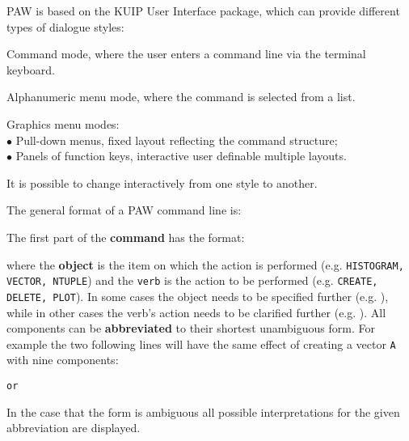 PAW is based on the KUIP\cite{bib-KUIP} User Interface package,
which can provide different types of dialogue styles:

\begin{UL}
\item Command mode,
      where the user enters a command line via the terminal keyboard.
\item Alphanumeric menu mode,
      where the command is selected from a list.
\item Graphics menu modes:\\
\hspace*{1em}$\bullet$ 
Pull-down menus, fixed layout reflecting the command structure;\\
\hspace*{1em}$\bullet$ 
Panels of function keys, interactive user definable multiple layouts.
\end{UL}

It is possible to change interactively from one style to another.
 
The general format of a PAW command line is:
\begin{alltt}
\end{alltt}
The first part of the {\bf command} has the format:
\begin{alltt}
\end{alltt}
where the {\bf object} is the item on which the action is performed
(e.g. \texttt{HISTOGRAM, VECTOR, NTUPLE})
and the \texttt{verb} is the action to be performed (e.g.
\texttt{CREATE, DELETE, PLOT}). 
In some cases the object needs to be
specified further (e.g. ),
while in other cases the verb's action needs to be clarified further
(e.g. ).
All components can be {\bf abbreviated} to their shortest unambiguous form. 
For example the two following
lines will have the same effect of creating a vector \texttt{A} with
nine components:
\begin{alltt}
{\rm or}
\end{alltt}
In the case that the form is ambiguous all possible interpretations
for the given abbreviation are displayed.
 
